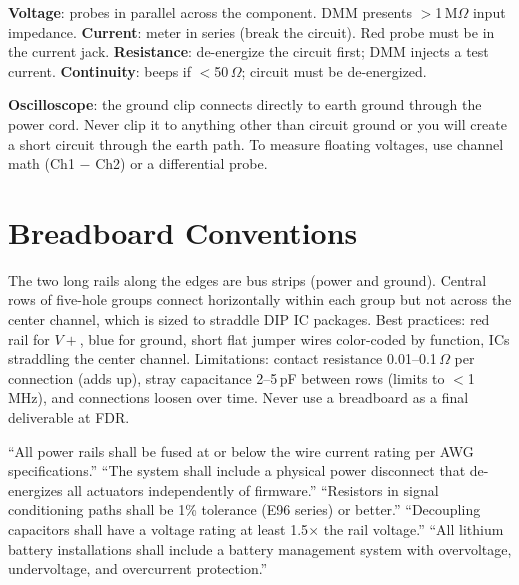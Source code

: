 \textbf{Voltage}: probes in parallel across the component. DMM presents $>$1\,M$\Omega$ input impedance. \textbf{Current}: meter in series (break the circuit). Red probe must be in the current jack. \textbf{Resistance}: de-energize the circuit first; DMM injects a test current. \textbf{Continuity}: beeps if $<$50\,$\Omega$; circuit must be de-energized.

\textbf{Oscilloscope}: the ground clip connects directly to earth ground through the power cord. Never clip it to anything other than circuit ground or you will create a short circuit through the earth path. To measure floating voltages, use channel math (Ch1 $-$ Ch2) or a differential probe.


\section{Breadboard Conventions}

The two long rails along the edges are bus strips (power and ground). Central rows of five-hole groups connect horizontally within each group but not across the center channel, which is sized to straddle DIP IC packages. Best practices: red rail for $V+$, blue for ground, short flat jumper wires color-coded by function, ICs straddling the center channel. Limitations: contact resistance 0.01--0.1\,$\Omega$ per connection (adds up), stray capacitance 2--5\,pF between rows (limits to $<$1\,MHz), and connections loosen over time. Never use a breadboard as a final deliverable at FDR.

\begin{keyconceptbox}
``All power rails shall be fused at or below the wire current rating per AWG specifications.'' ``The system shall include a physical power disconnect that de-energizes all actuators independently of firmware.'' ``Resistors in signal conditioning paths shall be 1\% tolerance (E96 series) or better.'' ``Decoupling capacitors shall have a voltage rating at least 1.5$\times$ the rail voltage.'' ``All lithium battery installations shall include a battery management system with overvoltage, undervoltage, and overcurrent protection.''
\end{keyconceptbox}

